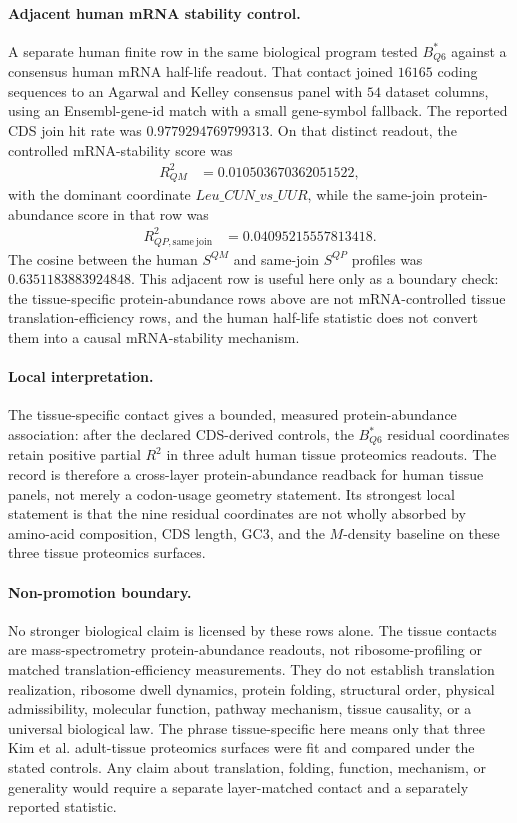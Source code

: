 \paragraph{Adjacent human mRNA stability control.}
A separate human finite row in the same biological program tested $B^{\ast}_{Q6}$ against a consensus human mRNA half-life readout.  That contact joined $16165$ coding sequences to an Agarwal and Kelley consensus panel with $54$ dataset columns, using an Ensembl-gene-id match with a small gene-symbol fallback.  The reported CDS join hit rate was $0.9779294769799313$.  On that distinct readout, the controlled mRNA-stability score was
$$
\begin{aligned}
R^2_{QM} &= 0.010503670362051522,
\end{aligned}
$$
with the dominant coordinate $Leu\_CUN\_vs\_UUR$, while the same-join protein-abundance score in that row was
$$
\begin{aligned}
R^2_{QP,\mathrm{same\ join}} &= 0.04095215557813418.
\end{aligned}
$$
The cosine between the human $S^{QM}$ and same-join $S^{QP}$ profiles was $0.6351183883924848$.  This adjacent row is useful here only as a boundary check: the tissue-specific protein-abundance rows above are not mRNA-controlled tissue translation-efficiency rows, and the human half-life statistic does not convert them into a causal mRNA-stability mechanism.

\paragraph{Local interpretation.}
The tissue-specific contact gives a bounded, measured protein-abundance association: after the declared CDS-derived controls, the $B^{\ast}_{Q6}$ residual coordinates retain positive partial $R^2$ in three adult human tissue proteomics readouts.  The record is therefore a cross-layer protein-abundance readback for human tissue panels, not merely a codon-usage geometry statement.  Its strongest local statement is that the nine residual coordinates are not wholly absorbed by amino-acid composition, CDS length, GC3, and the $M$-density baseline on these three tissue proteomics surfaces.

\paragraph{Non-promotion boundary.}
No stronger biological claim is licensed by these rows alone.  The tissue contacts are mass-spectrometry protein-abundance readouts, not ribosome-profiling or matched translation-efficiency measurements.  They do not establish translation realization, ribosome dwell dynamics, protein folding, structural order, physical admissibility, molecular function, pathway mechanism, tissue causality, or a universal biological law.  The phrase tissue-specific here means only that three Kim et al. adult-tissue proteomics surfaces were fit and compared under the stated controls.  Any claim about translation, folding, function, mechanism, or generality would require a separate layer-matched contact and a separately reported statistic.